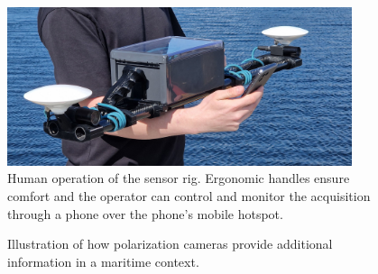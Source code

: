 \documentclass{iopconfser}
\begin{document}
\pagebreak
\begin{figure}[H]
    \centering
    \includegraphics[width=0.9\textwidth]{figures/operation.jpg}
    \caption{Human operation of the sensor rig. Ergonomic handles ensure comfort and the operator can control and monitor the acquisition through a phone over the phone's mobile hotspot.}
\end{figure}


\begin{figure}[H]
    \hfill
    \caption{Illustration of how polarization cameras provide additional information in a maritime context.}
    \label{fig:polarization_visualization}
\end{figure}
\end{document}
